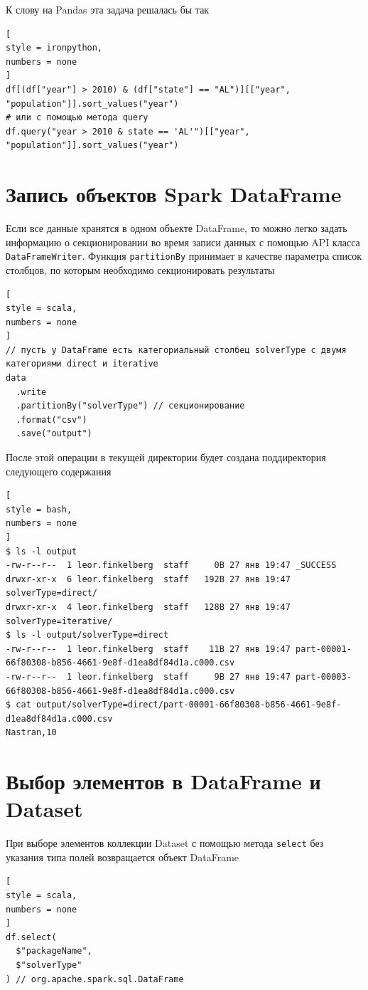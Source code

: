 \documentclass[%
	11pt,
	a4paper,
	utf8,
		]{article}
\begin{document}
К слову на Pandas эта задача решалась бы так
\begin{lstlisting}[
style = ironpython,
numbers = none	
]
df[(df["year"] > 2010) & (df["state"] == "AL")][["year", "population"]].sort_values("year")
# или с помощью метода query
df.query("year > 2010 & state == 'AL'")[["year", "population"]].sort_values("year")
\end{lstlisting}


\section{Запись объектов Spark DataFrame}

Если все данные хранятся в одном объекте DataFrame, то можно легко задать информацию о секционировании во время записи данных с помощью API класса \texttt{DataFrameWriter}. Функция \texttt{partitionBy} принимает в качестве параметра список столбцов, по которым необходимо секционировать результаты
\begin{lstlisting}[
style = scala,
numbers = none	
]
// пусть у DataFrame есть категориальный столбец solverType с двумя категориями direct и iterative
data
  .write
  .partitionBy("solverType") // секционирование
  .format("csv")
  .save("output")
\end{lstlisting}

После этой операции в текущей директории будет создана поддиректория  следующего содержания
\begin{lstlisting}[
style = bash,
numbers = none	
]
$ ls -l output
-rw-r--r--  1 leor.finkelberg  staff     0B 27 янв 19:47 _SUCCESS
drwxr-xr-x  6 leor.finkelberg  staff   192B 27 янв 19:47 solverType=direct/
drwxr-xr-x  4 leor.finkelberg  staff   128B 27 янв 19:47 solverType=iterative/
$ ls -l output/solverType=direct
-rw-r--r--  1 leor.finkelberg  staff    11B 27 янв 19:47 part-00001-66f80308-b856-4661-9e8f-d1ea8df84d1a.c000.csv
-rw-r--r--  1 leor.finkelberg  staff     9B 27 янв 19:47 part-00003-66f80308-b856-4661-9e8f-d1ea8df84d1a.c000.csv
$ cat output/solverType=direct/part-00001-66f80308-b856-4661-9e8f-d1ea8df84d1a.c000.csv
Nastran,10
\end{lstlisting}

\section{Выбор элементов в DataFrame и Dataset}

При выборе элементов коллекции Dataset с помощью метода \texttt{select} без указания типа полей возвращается объект DataFrame
\begin{lstlisting}[
style = scala,
numbers = none	
]
df.select(
  $"packageName",
  $"solverType"
) // org.apache.spark.sql.DataFrame
\end{lstlisting}
\end{document}
